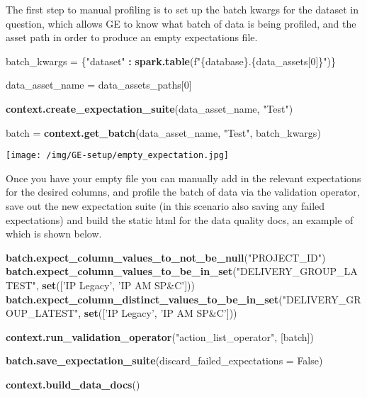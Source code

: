 \documentclass[]{article}
\newenvironment{Shaded}{\begin{snugshade}}{\end{snugshade}}
\newcommand{\DataTypeTok}[1]{\textcolor[rgb]{0.13,0.29,0.53}{#1}}
\newcommand{\DecValTok}[1]{\textcolor[rgb]{0.00,0.00,0.81}{#1}}
\newcommand{\KeywordTok}[1]{\textcolor[rgb]{0.13,0.29,0.53}{\textbf{#1}}}
\newcommand{\NormalTok}[1]{#1}
\newcommand{\OperatorTok}[1]{\textcolor[rgb]{0.81,0.36,0.00}{\textbf{#1}}}
\newcommand{\StringTok}[1]{\textcolor[rgb]{0.31,0.60,0.02}{#1}}
\begin{document}
The first step to manual profiling is to set up the batch kwargs for the
dataset in question, which allows GE to know what batch of data is being
profiled, and the asset path in order to produce an empty expectations
file.

\begin{Shaded}
\begin{Highlighting}[]
\NormalTok{batch_kwargs =}\StringTok{ }\NormalTok{\{}\StringTok{"dataset"} \OperatorTok{:}\StringTok{ }\KeywordTok{spark.table}\NormalTok{(f}\StringTok{"\{database\}.\{data_assets[0]\}"}\NormalTok{)\}}

\NormalTok{data_asset_name =}\StringTok{ }\NormalTok{data_assets_paths[}\DecValTok{0}\NormalTok{]}

\KeywordTok{context.create_expectation_suite}\NormalTok{(data_asset_name, }\StringTok{"Test"}\NormalTok{)}

\NormalTok{batch =}\StringTok{ }\KeywordTok{context.get_batch}\NormalTok{(data_asset_name, }\StringTok{"Test"}\NormalTok{, batch_kwargs)}
\end{Highlighting}
\end{Shaded}

\texttt{[image: /img/GE-setup/empty\_expectation.jpg]}

Once you have your empty file you can manually add in the relevant
expectations for the desired columns, and profile the batch of data via
the validation operator, save out the new expectation suite (in this
scenario also saving any failed expectations) and build the static html
for the data quality docs, an example of which is shown below.

\begin{Shaded}
\begin{Highlighting}[]
\KeywordTok{batch.expect_column_values_to_not_be_null}\NormalTok{(}\StringTok{"PROJECT_ID"}\NormalTok{)}
\KeywordTok{batch.expect_column_values_to_be_in_set}\NormalTok{(}\StringTok{"DELIVERY_GROUP_LATEST"}\NormalTok{, }\KeywordTok{set}\NormalTok{([}\StringTok{'IP Legacy'}\NormalTok{, }\StringTok{'IP AM SP&C'}\NormalTok{]))}
\KeywordTok{batch.expect_column_distinct_values_to_be_in_set}\NormalTok{(}\StringTok{"DELIVERY_GROUP_LATEST"}\NormalTok{, }\KeywordTok{set}\NormalTok{([}\StringTok{'IP Legacy'}\NormalTok{, }\StringTok{'IP AM SP&C'}\NormalTok{]))}

\KeywordTok{context.run_validation_operator}\NormalTok{(}\StringTok{"action_list_operator"}\NormalTok{, [batch])}

\KeywordTok{batch.save_expectation_suite}\NormalTok{(}\DataTypeTok{discard_failed_expectations =}\NormalTok{ False)}

\KeywordTok{context.build_data_docs}\NormalTok{()}
\end{Highlighting}
\end{Shaded}
\end{document}
